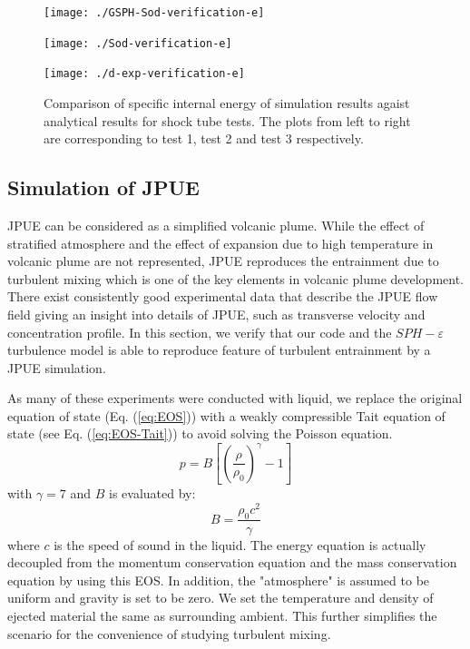 \documentclass[gmd, manuscript]{copernicus}
\begin{document}
\begin{figure}[!htb]
    \centering
    \begin{minipage}{.325\textwidth}
        \centering
        \texttt{[image: ./GSPH-Sod-verification-e]}
    \end{minipage}%
    \begin{minipage}{.325 \textwidth}
        \centering
        \texttt{[image: ./Sod-verification-e]}
    \end{minipage}%
    \begin{minipage}{.325 \textwidth}
        \centering
        \texttt{[image: ./d-exp-verification-e]}
    \end{minipage}%
    \caption{Comparison of specific internal energy of simulation results agaist analytical results for shock tube tests. The plots from left to right are corresponding to test 1, test 2 and test 3 respectively.}
    \label{fig:1D-shock-tests-verification}
\end{figure}

\subsection{Simulation of JPUE}
JPUE can be considered as a simplified volcanic plume. While the effect of stratified atmosphere and the effect of expansion due to high temperature in volcanic plume are not represented, JPUE reproduces the entrainment due to turbulent mixing which is one of the key elements in volcanic plume development. There exist consistently good experimental data \citep { list1982turbulent,dimotakis1983structure, papanicolaou1988investigations, ezzamel2015dynamical} that describe the JPUE flow field giving an insight into details of JPUE, such as transverse velocity and concentration profile. In this section, we verify that our code and the $SPH-\varepsilon$ turbulence model is able to reproduce feature of turbulent entrainment by a JPUE simulation.

As many of these experiments were conducted with liquid, we replace the original equation of state (Eq. (\ref{eq:EOS})) with a weakly compressible Tait equation of state \citep {becker2007weakly} (see Eq. (\ref{eq:EOS-Tait})) to avoid solving the Poisson equation.
\begin{equation}
p=B\left[\left(\dfrac{\rho}{\rho_0}\right)^{\gamma}-1\right]
\label{eq:EOS-Tait}
\end{equation}
with $\gamma=7$ and $B$ is evaluated by:
\begin{equation}
B=\dfrac{\rho_0 c^2}{\gamma}
\end{equation}
where $c$ is the speed of sound in the liquid. The energy equation is actually decoupled from the momentum conservation equation and the mass conservation equation by using this EOS. In addition, the "atmosphere" is assumed to be uniform and gravity is set to be zero. We set the temperature and density of ejected material the same as surrounding ambient. This further simplifies the scenario for the convenience of studying turbulent mixing. 
\end{document}
